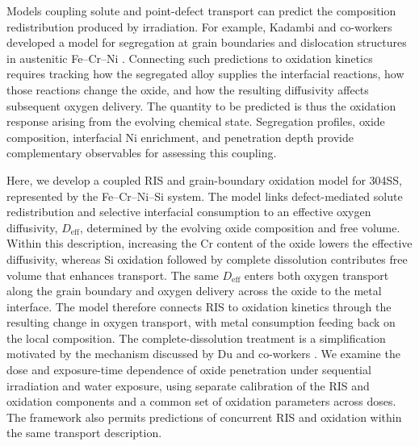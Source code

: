 Models coupling solute and point-defect transport can predict the
composition redistribution produced by irradiation. For example,
Kadambi and co-workers developed a model for segregation at grain
boundaries and dislocation structures in austenitic Fe--Cr--Ni
\parencite{kadambi2025}. Connecting such predictions to oxidation
kinetics requires tracking how the segregated alloy supplies the
interfacial reactions, how those reactions change the oxide, and how
the resulting diffusivity affects subsequent oxygen delivery. The
quantity to be predicted is thus the oxidation response arising from
the evolving chemical state. Segregation profiles, oxide composition,
interfacial Ni enrichment, and penetration depth provide complementary
observables for assessing this coupling.

Here, we develop a coupled RIS and grain-boundary oxidation model for
304SS, represented by the Fe--Cr--Ni--Si system. The model links
defect-mediated solute redistribution and selective interfacial
consumption to an effective oxygen diffusivity, \(D_{\mathrm{eff}}\),
determined by the evolving oxide composition and free volume. Within
this description, increasing the Cr content of the oxide lowers the
effective diffusivity, whereas Si oxidation followed by complete
dissolution contributes free volume that enhances transport. The same
\(D_{\mathrm{eff}}\) enters both oxygen transport along the grain boundary
and oxygen delivery across the oxide to the metal interface. The model
therefore connects RIS to oxidation kinetics through the resulting change
in oxygen transport, with metal consumption feeding back on the local
composition. The complete-dissolution treatment is a simplification
motivated by the mechanism discussed by Du and co-workers
\parencite{du2026}. We examine the dose and exposure-time dependence of
oxide penetration under sequential irradiation and water exposure, using
separate calibration of the RIS and oxidation components and a common
set of oxidation parameters across doses. The framework also permits
predictions of concurrent RIS and oxidation within the same transport
description.
